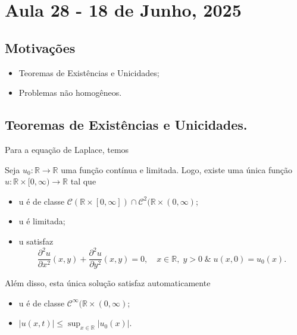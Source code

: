 \documentclass[../pde_notes.tex]{subfiles}
\begin{document}
\section{Aula 28 - 18 de Junho, 2025}
\subsection{Motivações}
\begin{itemize}
	\item Teoremas de Existências e Unicidades;
	\item Problemas não homogêneos.
\end{itemize}
\subsection{Teoremas de Existências e Unicidades.}
Para a equação de Laplace, temos
\begin{theorem*}
	Seja \(u_{0}:\mathbb{R}\rightarrow \mathbb{R}\) uma função contínua e limitada. Logo, existe uma única função \(u:\mathbb{R}\times [0, \infty)\rightarrow \mathbb{R}\) tal que
	\begin{itemize}
		\item[1)] u é de classe \(\mathcal{C}(\mathbb{R}\times [0, \infty])\cap \mathcal{C}^{2}(\mathbb{R}\times (0, \infty)\);
		\item[2)] u é limitada;
		\item[3)] u satisfaz
		      \[
			      \frac{\partial^{2}u}{\partial x^{2}}(x, y) + \frac{\partial^{2}u}{\partial y^{2}}(x, y) = 0,\quad x\in \mathbb{R},\; y > 0\;\&\; u(x, 0) = u_{0}(x).
		      \]
	\end{itemize}
	Além disso, esta única solução satisfaz automaticamente
	\begin{itemize}
		\item[4)] u é de classe \(\mathcal{C}^{\infty}(\mathbb{R}\times (0, \infty)\);
		\item[5)] \(|u(x, t)|\leq \sup_{x\in \mathbb{R}}|u_{0}(x)|\).
	\end{itemize}
\end{theorem*}
\end{document}
